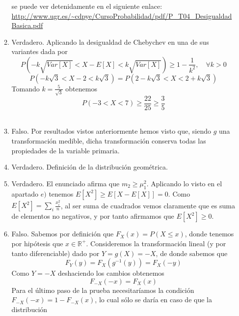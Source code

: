 \documentclass[fleqn]{article}
\def\R{\mathds{R}}
\begin{document}
\begin{enumerate}
\begin{enumerate}
                                        se puede ver detenidamente en el siguiente enlace: \url{http://www.ugr.es/~cdpye/CursoProbabilidad/pdf/P_T04_DesigualdadBasica.pdf}\\
                                \item Verdadero. Aplicando la desigualdad de Chebychev en una de sus variantes dada por 
                                        $$P\left( - k\sqrt{Var[X]} < X - E[X] < k\sqrt{Var[X]}\right) \geq 1- \frac{1}{k^2}, \quad \forall k>0$$
                                        $$P\left( - k\sqrt{3} < X - 2 < k\sqrt{3}\right) = P\left( 2 - k\sqrt{3} < X < 2 + k\sqrt{3}\right)$$
                                        Tomando $k = \frac{5}{\sqrt{3}}$ obtenemos 
                                        $$P\left( - 3 < X < 7\right) \geq \frac{22}{25} \geq \frac{3}{5}$$\\
                                \item Falso. Por resultados vistos anteriormente hemos visto que, siendo $g$ una transformación medible, dicha transformación 
                                        conserva todas las propiedades de la variable primaria.\\
                                \item Verdadero. Definición de la distribución geométrica.\\
                                \item Verdadero. El enunciado afirma que $m_2 \geq \mu_1^2$. Aplicando lo visto en el apartado $e)$ tenemos $ E[X^2] \geq E[X- E[X]] = 0$.
                                        Como $E[X^2] = \sum_i \frac{x_i^2}{n}$, al ser suma de cuadrados vemos claramente que es suma de elementos no negativos,
                                        y por tanto afirmamos que $E[X^2] \geq 0$.\\
                                \item Falso. Sabemos por definición que $F_X (x) = P(X\leq x) $, donde tenemos por hipótesis que $x \in \R^+$. Consideremos la transformación lineal 
                                        (y por tanto diferenciable) dado por $Y = g(X) = -X$, de donde sabemos que 
                                        $$F_Y(y) = F_X(g^{-1}(y)) = F_X(-y)$$ 
                                        Como $Y=-X$ deshaciendo los cambios obtenemos 
                                        $$F_{-X}(-x) = F_X(x)$$
                                        Para el último paso de la prueba necesitaríamos la condición $F_{-X}(-x) = 1 - F_{-X}(x)$, lo cual sólo se daría en caso de que la distribución

\end{enumerate}
\end{enumerate}
\end{document}
